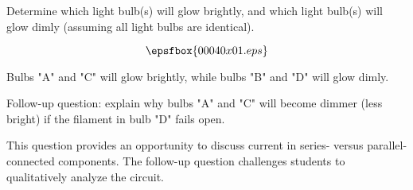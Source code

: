 

Determine which light bulb(s) will glow brightly, and which light bulb(s) will glow dimly (assuming all light bulbs are identical).

$$\epsfbox{00040x01.eps}$$







Bulbs "A" and "C" will glow brightly, while bulbs "B" and "D" will glow dimly.

\vskip 10pt

Follow-up question: explain why bulbs "A" and "C" will become dimmer (less bright) if the filament in bulb "D" fails open.







This question provides an opportunity to discuss current in series- versus parallel-connected components.  The follow-up question challenges students to qualitatively analyze the circuit.




